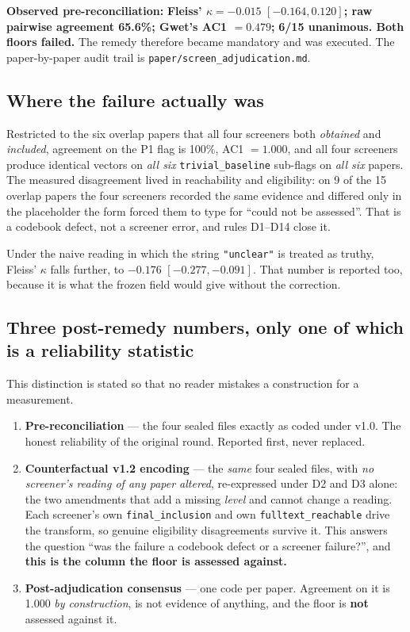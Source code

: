\documentclass[11pt,a4paper]{article}
\begin{document}
\textbf{Observed pre-reconciliation:} \textbf{Fleiss' $\kappa = -0.015$}
\textbf{$[-0.164, 0.120]$; raw pairwise agreement 65.6\%; Gwet's AC1 $=0.479$;}
\textbf{6/15 unanimous. Both floors failed.}
The remedy therefore became mandatory and was executed. The paper-by-paper audit
trail is \texttt{paper/}\allowbreak\texttt{screen\_adjudication.md}.

\subsection{Where the failure actually was}

Restricted to the six overlap papers that all four screeners both \emph{obtained} and
\emph{included}, agreement on the P1 flag is 100\%, AC1 $=1.000$, and all four
screeners produce identical vectors on \emph{all six} \texttt{trivial\_baseline}
sub-flags on \emph{all six} papers. The measured disagreement lived in reachability
and eligibility: on 9 of the 15 overlap papers the four screeners recorded the same
evidence and differed only in the placeholder the form forced them to type for ``could
not be assessed''. That is a codebook defect, not a screener error, and rules D1--D14
close it.

Under the naive reading in which the string \texttt{"unclear"} is treated as truthy,
Fleiss' $\kappa$ falls further, to $-0.176$ $[-0.277, -0.091]$. That number is
reported too, because it is what the frozen field would give without the correction.

\subsection{Three post-remedy numbers, only one of which is a reliability statistic}

This distinction is stated so that no reader mistakes a construction for a
measurement.

\begin{enumerate}
\item \textbf{Pre-reconciliation} --- the four sealed files exactly as coded under
v1.0. The honest reliability of the original round. Reported first, never replaced.

\item \textbf{Counterfactual v1.2 encoding} --- the \emph{same} four sealed files,
with \emph{no screener's reading of any paper altered}, re-expressed under D2 and D3
alone: the two amendments that add a missing \emph{level} and cannot change a
reading. Each screener's own \texttt{final\_inclusion} and own
\texttt{fulltext\_reachable} drive the transform, so genuine eligibility
disagreements survive it. This answers the question ``was the failure a codebook
defect or a screener failure?'', and \textbf{this is the column the floor is assessed
against.}

\item \textbf{Post-adjudication consensus} --- one code per paper. Agreement on it is
1.000 \emph{by construction}, is not evidence of anything, and the floor is
\textbf{not} assessed against it.
\end{enumerate}
\end{document}
